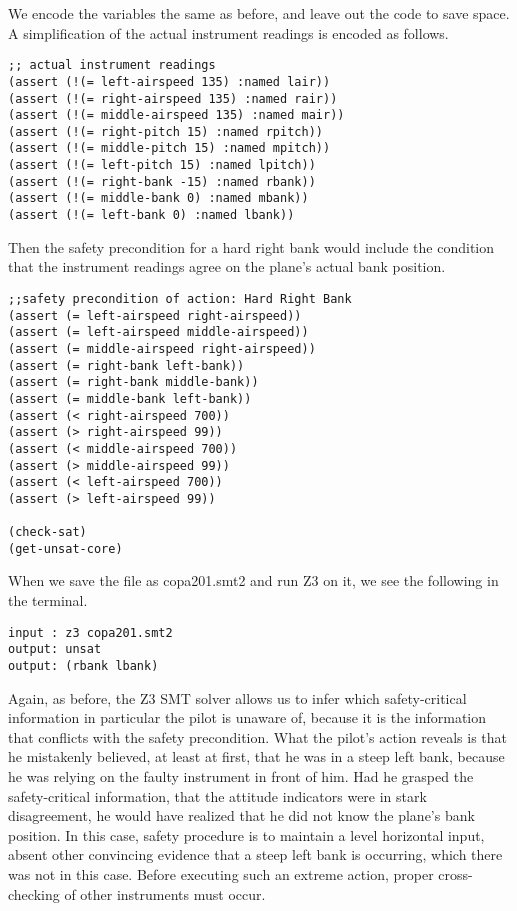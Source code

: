 We encode the variables the same as before, and leave out the code to save space. A simplification of the actual instrument readings is encoded as follows.
\noindent
\begin{tcolorbox}
	\begin{lstlisting}
;; actual instrument readings
(assert (!(= left-airspeed 135) :named lair))
(assert (!(= right-airspeed 135) :named rair))
(assert (!(= middle-airspeed 135) :named mair))
(assert (!(= right-pitch 15) :named rpitch))
(assert (!(= middle-pitch 15) :named mpitch))
(assert (!(= left-pitch 15) :named lpitch))
(assert (!(= right-bank -15) :named rbank))
(assert (!(= middle-bank 0) :named mbank))
(assert (!(= left-bank 0) :named lbank))
	\end{lstlisting}	
\end{tcolorbox}	
\noindent
Then the safety precondition for a hard right bank would include the condition that the instrument readings agree on the plane's actual bank position.
\noindent
\begin{tcolorbox}
	\begin{lstlisting}
;;safety precondition of action: Hard Right Bank
(assert (= left-airspeed right-airspeed))
(assert (= left-airspeed middle-airspeed))
(assert (= middle-airspeed right-airspeed))
(assert (= right-bank left-bank))
(assert (= right-bank middle-bank))
(assert (= middle-bank left-bank))
(assert (< right-airspeed 700))
(assert (> right-airspeed 99))
(assert (< middle-airspeed 700))
(assert (> middle-airspeed 99))
(assert (< left-airspeed 700))
(assert (> left-airspeed 99))

(check-sat)
(get-unsat-core)
	\end{lstlisting}	
\end{tcolorbox}	
\noindent
When we save the file as copa201.smt2 and run Z3 on it, we see the following in the terminal.
\noindent
\begin{tcolorbox}
	\begin{lstlisting}
input : z3 copa201.smt2
output: unsat
output: (rbank lbank)
	\end{lstlisting}
\end{tcolorbox}
\noindent
Again, as before, the Z3 SMT solver allows us to infer which safety-critical information in particular the pilot is unaware of, because it is the information that conflicts with the safety precondition. What the pilot's action reveals is that he mistakenly believed, at least at first, that he was in a steep left bank, because he was relying on the faulty instrument in front of him. Had he grasped the safety-critical information, that the attitude indicators were in stark disagreement, he would have realized that he did not know the plane's bank position. In this case, safety procedure is to maintain a level horizontal input, absent other convincing evidence that a steep left bank is occurring, which there was not in this case. Before executing such an extreme action, proper cross-checking of other instruments must occur.  

